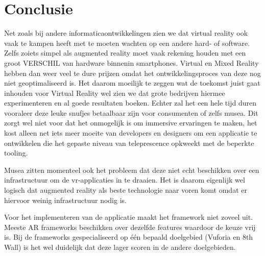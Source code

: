 
\chapter{Conclusie}
\label{ch:conclusie}


Net zoals bij andere informaticaontwikkelingen zien we dat virtual reality ook vaak te kampen heeft met te moeten wachten op een andere hard- of software. Zelfs zoiets simpel als augmented reality moet vaak rekening houden met een groot VERSCHIL van hardware binnenin smartphones. Virtual en Mixed Reality hebben dan weer veel te dure prijzen omdat het ontwikkelingsproces van deze nog niet geoptimaliseerd is. Het daarom moeilijk te zeggen wat de toekomst juist gaat inhouden voor Virtual Reality wel zien we dat grote bedrijven hiermee experimenteren en al goede resultaten boeken. Echter zal het een hele tijd duren vooraleer deze leuke snufjes betaalbaar zijn voor consumenten of zelfs musea. Dit zorgt wel niet voor dat het onmogelijk is om immersive ervaringen te maken, het kost alleen net iets meer moeite van developers en designers om een applicatie te ontwikkelen die het gepaste niveau van teleprescence opkweekt met de beperkte tooling.

Musea zitten momenteel ook het probleem dat deze niet echt beschikken over een infrastructuur om de vr-applicaties in te draaien. Het is daarom eigenlijk wel logisch dat augmented reality als beste technologie naar voren komt omdat er hiervoor weinig infrastructuur nodig is. 

Voor het implementeren van de applicatie maakt het framework niet zoveel uit. Meeste AR frameworks beschikken over dezelfde features waardoor de keuze vrij is. Bij de frameworks gespecialiseerd op één bepaald doelgebied (Vuforia en 8th Wall) is het wel duidelijk dat deze lager scoren in de andere doelgebieden.